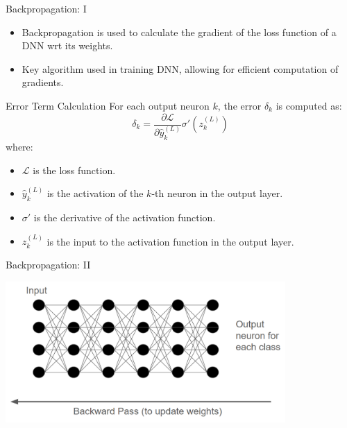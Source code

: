 \documentclass[aspectratio=169]{../latex_main/tntbeamer}  %
\begin{document}
  	\begin{frame}{Backpropagation: I}

        \vspace{-2em}
        \begin{itemize}
            \item Backpropagation is used to calculate the gradient of the loss function of a DNN wrt its weights.
            \item Key algorithm used in training DNN, allowing for efficient computation of gradients.
        \end{itemize}
        
        \begin{block}{Error Term Calculation}
        For each output neuron \( k \), the error \( \delta_k \) is computed as:
        \[
        \delta_k = \frac{\partial \mathcal{L}}{\partial \hat{y}_k^{(L)}} \sigma'(z_k^{(L)})
        \]
        where:
        \begin{itemize}
            \item \( \mathcal{L} \) is the loss function.
            \item \( \hat{y}_k^{(L)} \) is the activation of the \( k \)-th neuron in the output layer.
            \item \( \sigma' \) is the derivative of the activation function.
            \item \( z_k^{(L)} \) is the input to the activation function in the output layer.
        \end{itemize}
        \end{block}

        \end{frame}
  	\begin{frame}{Backpropagation: II}

        \includegraphics[width=0.8\textwidth]{figures/backward.png}

        \end{frame}
\end{document}
